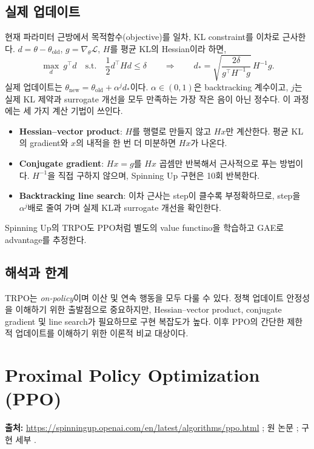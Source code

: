 \documentclass[11pt,a4paper]{article}
\begin{document}
\subsection{실제 업데이트}
현재 파라미터 근방에서 목적함수(objective)를 일차, KL constraint를 이차로 근사한다. \(d=\theta-\theta_{\mathrm{old}}\), \(g=\nabla_\theta\mathcal L\), \(H\)를 평균 KL의 Hessian이라 하면,
\begin{equation}
 \max_d\ g^\top d\quad\text{s.t.}\quad\frac12 d^\top H d\le\delta
 \qquad\Longrightarrow\qquad
 d_*=\sqrt{\frac{2\delta}{g^\top H^{-1}g}}\,H^{-1}g.
\end{equation}
실제 업데이트는 \(\theta_{\mathrm{new}}=\theta_{\mathrm{old}}+\alpha^j d_*\)이다. \(\alpha\in(0,1)\)은 backtracking 계수이고, \(j\)는 실제 KL 제약과 surrogate 개선을 모두 만족하는 가장 작은 음이 아닌 정수다. 이 과정에는 세 가지 계산 기법이 쓰인다.
\begin{itemize}
 \item \textbf{Hessian--vector product}: \(H\)를 행렬로 만들지 않고 \(Hx\)만 계산한다. 평균 KL의 gradient와 \(x\)의 내적을 한 번 더 미분하면 \(Hx\)가 나온다.
 \item \textbf{Conjugate gradient}: \(Hx=g\)를 \(Hx\) 곱셈만 반복해서 근사적으로 푸는 방법이다. \(H^{-1}\)을 직접 구하지 않으며, Spinning Up 구현은 10회 반복한다.
 \item \textbf{Backtracking line search}: 이차 근사는 step이 클수록 부정확하므로, step을 \(\alpha^j\)배로 줄여 가며 실제 KL과 surrogate 개선을 확인한다.
\end{itemize}
Spinning Up의 TRPO도 PPO처럼 별도의 value functino을 학습하고 GAE로 advantage를 추정한다.

\subsection{해석과 한계}
TRPO는 \emph{on-policy}이며 이산 및 연속 행동을 모두 다룰 수 있다. 정책 업데이트 안정성을 이해하기 위한 출발점으로 중요하지만, Hessian--vector product, conjugate gradient 및 line search가 필요하므로 구현 복잡도가 높다. 이후 PPO의 간단한 제한적 업데이트를 이해하기 위한 이론적 비교 대상이다.

\section{Proximal Policy Optimization (PPO)}\label{sec:ppo}
\noindent\textbf{출처:} \url{https://spinningup.openai.com/en/latest/algorithms/ppo.html} \cite{spin-ppo}; 원 논문 \cite{ppo}; 구현 세부 \cite{ppo-details,whatmatters}.
\end{document}
